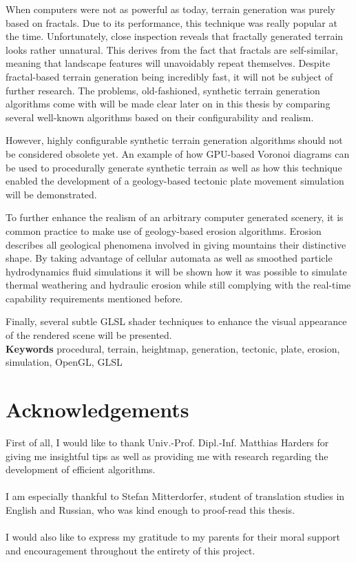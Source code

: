 \documentclass[11pt,a4paper,twoside,openright]{report}
\begin{document}
When computers were not as powerful as today, terrain generation was purely based on fractals. Due to its performance, this technique was really popular at the time. Unfortunately, close inspection reveals that fractally generated terrain looks rather unnatural. This derives from the fact that fractals are self-similar, meaning that landscape features will unavoidably repeat themselves. Despite fractal-based terrain generation being incredibly fast, it will not be subject of further research. The problems, old-fashioned, synthetic terrain generation algorithms come with will be made clear later on in this thesis by comparing several well-known algorithms based on their configurability and realism.

However, highly configurable synthetic terrain generation algorithms should not be considered obsolete yet. An example of how GPU-based Voronoi diagrams can be used to procedurally generate synthetic terrain as well as how this technique enabled the development of a geology-based tectonic plate movement simulation will be demonstrated.

To further enhance the realism of an arbitrary computer generated scenery, it is common practice to make use of geology-based erosion algorithms. Erosion describes all geological phenomena involved in giving mountains their distinctive shape. By taking advantage of cellular automata as well as smoothed particle hydrodynamics fluid simulations it will be shown how it was possible to simulate thermal weathering and hydraulic erosion while still complying with the real-time capability requirements mentioned before.

Finally, several subtle GLSL shader techniques to enhance the visual appearance of the rendered scene will be presented.
\medskip
\noindent \\\textbf{Keywords} procedural, terrain, heightmap, generation, tectonic, plate, erosion, simulation, OpenGL, GLSL

\chapter*{Acknowledgements}
First of all, I would like to thank Univ.-Prof. Dipl.-Inf. Matthias Harders for giving me insightful tips as well as providing me with research regarding the development of efficient algorithms.
\\
\\
I am especially thankful to Stefan Mitterdorfer, student of translation studies in English and Russian, who was kind enough to proof-read this thesis.
\\
\\
I would also like to express my gratitude to my parents for their moral support and encouragement throughout the entirety of this project.
\end{document}
